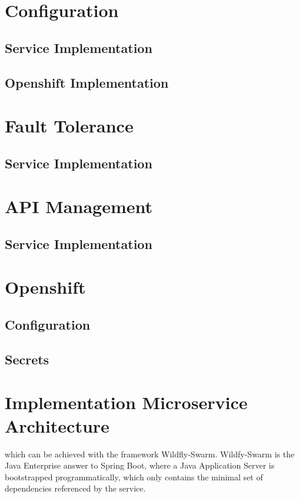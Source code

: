 \section{Configuration}
\label{sec:esbi-config}

\subsection{Service Implementation}
\label{sec:esbi-config-service}

\subsection{Openshift Implementation}
\label{sec:esbi-config-openshift}

\section{Fault Tolerance}
\label{sec:esbi-fault}

\subsection{Service Implementation}
\label{sec:esbi-fault-service}

\section{API Management}
\label{sec:esbi-api}

\subsection{Service Implementation}
\label{sec:esbi-api-service}

\section{Openshift}
\label{sec:esbi-openshift}

\subsection{Configuration}
\label{sec:esbi-openshift-config}

\subsection{Secrets}
\label{sec:esbi-openshift-secrets}

\section{Implementation Microservice Architecture}
\label{sec:esbi-impl-services}
 which can be achieved with the framework Wildfly-Swarm. Wildfy-Swarm is the Java Enterprise answer to Spring Boot, where a Java Application Server is bootstrapped programmatically, which only contains the minimal set of dependencies referenced by the service. 

